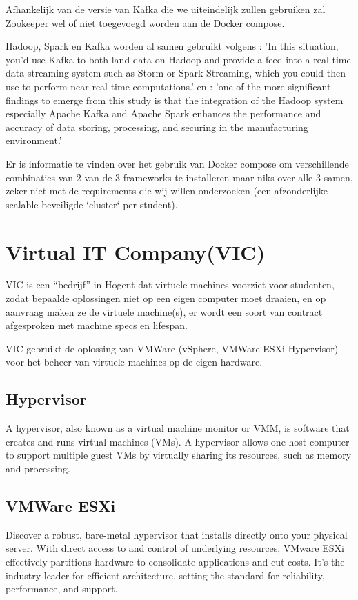Afhankelijk van de versie van Kafka die we uiteindelijk zullen gebruiken zal Zookeeper wel of niet toegevoegd worden aan de Docker compose.



Hadoop, Spark en Kafka worden al samen gebruikt volgens \textcite{Holmes2012}:
'In this situation, you'd use Kafka to both land data on Hadoop and provide a feed into a real-time data-streaming system such as Storm or Spark Streaming, which you could then use to perform near-real-time computations.' en \textcite{Leang2019}:
'one of the more significant findings to emerge from this study is that the integration of the Hadoop system especially Apache Kafka and Apache Spark enhances the performance and accuracy of data storing, processing, and securing in the manufacturing environment.'

Er is informatie te vinden over het gebruik van Docker compose om verschillende combinaties van 2 van de 3 frameworks te installeren maar niks over alle 3 samen, zeker niet met de requirements die wij willen onderzoeken (een afzonderlijke scalable beveiligde `cluster` per student).



\section{Virtual IT Company(VIC)}
VIC is een ``bedrijf'' in Hogent dat virtuele machines voorziet voor studenten, zodat bepaalde oplossingen niet op een eigen computer moet draaien, en op aanvraag maken ze de virtuele machine(s), er wordt een soort van contract afgesproken met machine specs en lifespan.

VIC gebruikt de oplossing van VMWare (vSphere, VMWare ESXi Hypervisor) voor het beheer van virtuele machines op de eigen hardware.

\subsection{Hypervisor}
A hypervisor, also known as a virtual machine monitor or VMM, is software that creates and runs virtual machines (VMs). A hypervisor allows one host computer to support multiple guest VMs by virtually sharing its resources, such as memory and processing.\autocite{VMware2023a}

\subsection{VMWare ESXi}
Discover a robust, bare-metal hypervisor that installs directly onto your physical server. With direct access to and control of underlying resources, VMware ESXi effectively partitions hardware to consolidate applications and cut costs. It’s the industry leader for efficient architecture, setting the standard for reliability, performance, and support.\autocite{VMware2023}

